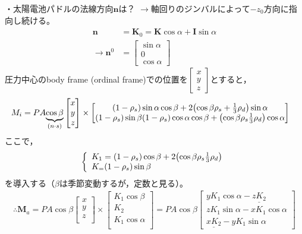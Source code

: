 \documentclass[class=article, crop=false, dvipdfmx, fleqn]{standalone}
\begin{document}
・太陽電池パドルの法線方向$\bm{n}$は？
$\rightarrow$軸回りのジンバルによって$-z_0$方向に指向し続ける。
\begin{align}
\bm{n} & = \bm{K}_0 = \bm{K} \cos\alpha + \bm{I} \sin\alpha \\
\rightarrow \bm{n}^0 & = \begin{bmatrix} \sin\alpha \\ 0 \\ \cos\alpha
\end{bmatrix}
\end{align}
圧力中心のbody frame (ordinal frame)での位置を$\begin{bmatrix} x \\ y \\ z \end{bmatrix}$とすると，
\begin{align}
\bm{M}_i & = PA \underexpl{\cos\beta}{(\bm{n}\cdot\bm{s})} \begin{bmatrix} x \\ y \\ z \end{bmatrix} \times
\begin{bmatrix}
(1-\rho_s)\sin\alpha\cos\beta + 2\qty(\cos\beta \rho_s + \frac{1}{3} \rho_d)\sin\alpha \\
(1-\rho_s) \sin\beta
(1-\rho_s)\cos\alpha \cos\beta + \qty(\cos\beta \rho_s \frac{1}{3} \rho_d) \cos\alpha
\end{bmatrix}
\end{align}
ここで，
\begin{equation}
\left\{ \begin{array}{l}
K_1 = (1-\rho_s) \cos\beta + 2\qty(\cos\beta \rho_s \frac{1}{3} \rho_d) \\
K_ = (1-\rho_s) \sin\beta
\end{array} \right.
\end{equation}
を導入する（$\beta$は季節変動するが，定数と見る）。
\begin{align}
\therefore
\bm{M}_a=PA\cos\beta\begin{bmatrix}
x\\
y\\
z\\
\end{bmatrix}
\times\begin{bmatrix}
K_1\cos\beta\\
K_2\\
K_1\cos\alpha\\
\end{bmatrix}
=
PA\cos\beta\begin{bmatrix}
yK_1\cos\alpha-\underline{zK_2}\\
zK_1\sin\alpha-xK_1\cos\alpha\\
\underline{xK_2}-yK_1\sin\alpha
\end{bmatrix}
\end{align}
\end{document}
